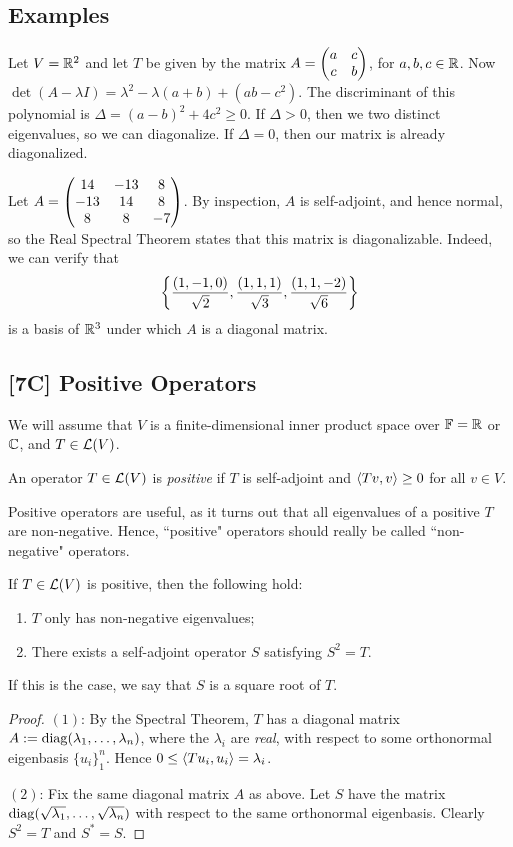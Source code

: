 \documentclass{article}
\begin{document}
\subsection*{Examples}
\begin{example}
Let $V = \mathbb R^2$ and let $T$ be given by the matrix $A = \begin{pmatrix}a & c \\ c & b \end{pmatrix}$, for $a,b,c\in\mathbb R$. Now $\det(A - \lambda I) = \lambda^2 - \lambda (a+b) + (ab-c^2)$. The discriminant of this polynomial is $\Delta = (a-b)^2 + 4c^2\geq 0$. If $\Delta > 0$, then we two distinct eigenvalues, so we can diagonalize. If $\Delta = 0$, then our matrix is already diagonalized.
\end{example}
\newpage
\begin{example}
Let $A = \begin{pmatrix}14 & -13 & 8 \\ -13 & 14 & 8 \\ 8 & 8 & -7 \end{pmatrix}$. By inspection, $A$ is self-adjoint, and hence normal, so the Real Spectral Theorem states that this matrix is diagonalizable. Indeed, we can verify that
$$\left\{\frac {(1,-1,0)}{\sqrt 2}, \frac{(1,1,1)}{\sqrt 3}, \frac{(1,1,-2)}{\sqrt 6}\right\}$$
is a basis of $\mathbb R^3$ under which $A$ is a diagonal matrix.
\end{example}
\subsection*{[7C] Positive Operators}
We will assume that $V$ is a finite-dimensional inner product space over $\mathbb F = \mathbb R$ or $\mathbb C$, and $T\in \mathcal L(V)$.
\begin{definition}
An operator $T\in\mathcal L(V)$ is \textit{positive} if $T$ is self-adjoint and $\left\langle Tv, v\right\rangle\geq 0$ for all $v\in V$.
\end{definition}
Positive operators are useful, as it turns out that all eigenvalues of a positive $T$ are non-negative. Hence, ``positive" operators should really be called ``non-negative" operators.
\begin{lemma}
If $T\in\mathcal L(V)$ is positive, then the following hold:
\begin{enumerate}
    \item $T$ only has non-negative eigenvalues;
    \item There exists a self-adjoint operator $S$ satisfying $S^2 = T$.
\end{enumerate}
If this is the case, we say that $S$ is a square root of $T$.
\end{lemma}
\begin{proof}
$(1)$: By the Spectral Theorem, $T$ has a diagonal matrix $A:=\operatorname{diag}(\lambda_1, \ldots, \lambda_n)$, where the $\lambda_i$ are \textit{real}, with respect to some orthonormal eigenbasis $\{u_i\}_1^n$. Hence $0\leq\left\langle Tu_i, u_i\right\rangle = \lambda_i$.

$(2)$: Fix the same diagonal matrix $A$ as above. Let $S$ have the matrix $\operatorname{diag}(\sqrt{\lambda_1}, \ldots, \sqrt{\lambda_n})$ with respect to the same orthonormal eigenbasis. Clearly $S^2 = T$ and $S^* = S$.
\end{proof}
\end{document}
